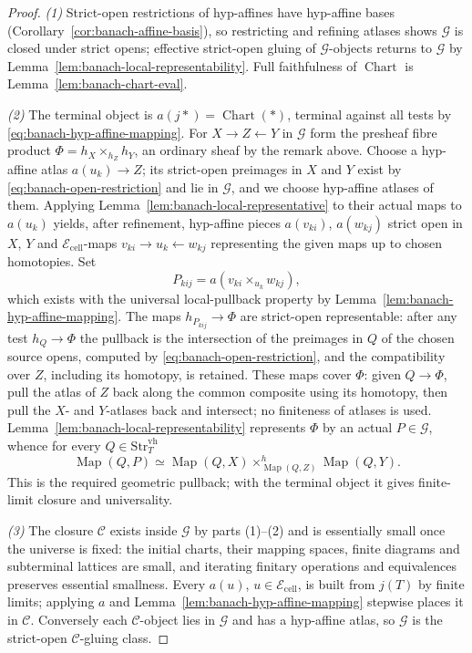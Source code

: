 \documentclass[12pt]{amsart}
\theoremstyle{definition}
\theoremstyle{remark}
\numberwithin{equation}{section}
\newcommand{\E}{\mathcal E}
\DeclareMathOperator{\Map}{Map}
\begin{document}
\begin{proof}
\emph{(1)} Strict-open restrictions of hyp-affines have hyp-affine
bases (Corollary~\ref{cor:banach-affine-basis}), so restricting and
refining atlases shows $\mathcal G$ is closed under strict opens;
effective strict-open gluing of $\mathcal G$-objects returns to
$\mathcal G$ by Lemma~\ref{lem:banach-local-representability}. Full
faithfulness of $\operatorname{Chart}$ is
Lemma~\ref{lem:banach-chart-eval}.

\emph{(2)} The terminal object is $a(j*)=\operatorname{Chart}(*)$,
terminal against all tests by
\eqref{eq:banach-hyp-affine-mapping}. For $X\to Z\leftarrow Y$ in
$\mathcal G$ form the presheaf fibre product
$\Phi=h_X\times_{h_Z}h_Y$, an ordinary sheaf by the remark above.
Choose a hyp-affine atlas $a(u_k)\to Z$; its strict-open preimages
in $X$ and $Y$ exist by \eqref{eq:banach-open-restriction} and lie
in $\mathcal G$, and we choose hyp-affine atlases of them. Applying
Lemma~\ref{lem:banach-local-representative} to their actual maps to
$a(u_k)$ yields, after refinement, hyp-affine pieces $a(v_{ki})$,
$a(w_{kj})$ strict open in $X$, $Y$ and $\E_{\mathrm{cell}}$-maps
$v_{ki}\to u_k\leftarrow w_{kj}$ representing the given maps up to
chosen homotopies. Set
\[
 P_{kij}=a\!\left(v_{ki}\times_{u_k}w_{kj}\right),
\]
which exists with the universal local-pullback property by
Lemma~\ref{lem:banach-hyp-affine-mapping}. The maps
$h_{P_{kij}}\to\Phi$ are strict-open representable: after any test
$h_Q\to\Phi$ the pullback is the intersection of the preimages in
$Q$ of the chosen source opens, computed by
\eqref{eq:banach-open-restriction}, and the compatibility over $Z$,
including its homotopy, is retained. These maps cover $\Phi$: given
$Q\to\Phi$, pull the atlas of $Z$ back along the common composite
using its homotopy, then pull the $X$- and $Y$-atlases back and
intersect; no finiteness of atlases is used.
Lemma~\ref{lem:banach-local-representability} represents $\Phi$ by an
actual $P\in\mathcal G$, whence for every
$Q\in\mathrm{Str}_T^{\mathrm{vh}}$
\[
 \Map(Q,P)\simeq
 \Map(Q,X)\times^h_{\Map(Q,Z)}\Map(Q,Y).
\]
This is the required geometric pullback; with the terminal object it
gives finite-limit closure and universality.

\emph{(3)} The closure $\mathcal C$ exists inside $\mathcal G$ by
parts (1)--(2) and is essentially small once the universe is fixed:
the initial charts, their mapping spaces, finite diagrams and
subterminal lattices are small, and iterating finitary operations
and equivalences preserves essential smallness. Every $a(u)$,
$u\in\E_{\mathrm{cell}}$, is built from $j(T)$ by finite limits;
applying $a$ and Lemma~\ref{lem:banach-hyp-affine-mapping} stepwise
places it in $\mathcal C$. Conversely each $\mathcal C$-object lies
in $\mathcal G$ and has a hyp-affine atlas, so $\mathcal G$ is the
strict-open $\mathcal C$-gluing class.
\end{proof}
\end{document}
